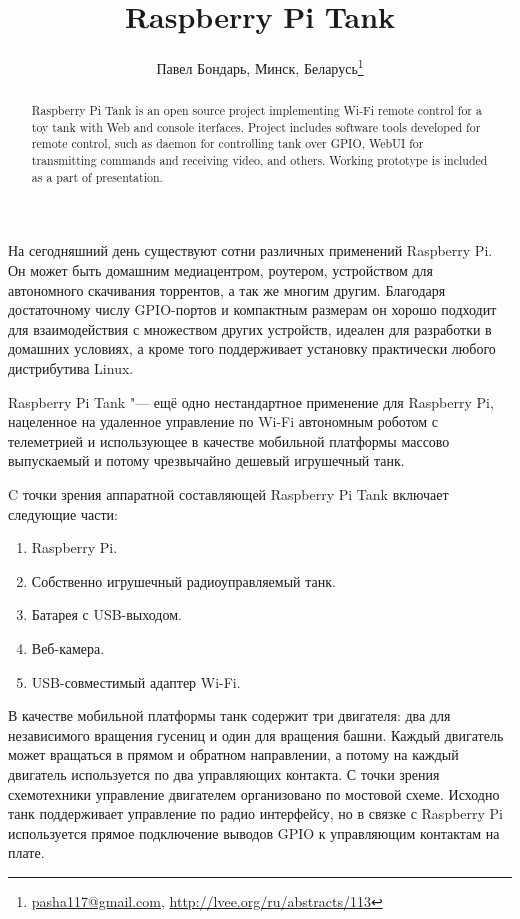 \documentclass[10pt, a5paper]{article}
\begin{document}
\title{Raspberry Pi Tank}
\author{Павел Бондарь, Минск, Беларусь\footnote{\url{pasha117@gmail.com}, \url{http://lvee.org/ru/abstracts/113}}}
\maketitle
\begin{abstract}
Raspberry Pi Tank is an open source project implementing Wi-Fi remote control for a toy tank with Web and console iterfaces. Project includes software tools developed for remote control, such as daemon for controlling tank over GPIO,  WebUI for transmitting commands and receiving video, and others. Working prototype is included as a part of presentation.
\end{abstract}
На сегодняшний день существуют сотни различных применений Raspberry Pi. Он может быть домашним медиацентром, роутером, устройством для автономного скачивания торрентов, а так же многим другим. Благодаря достаточному числу GPIO-портов и компактным размерам он хорошо подходит для взаимодействия с множеством других устройств, идеален для разработки в домашних условиях, а кроме того поддерживает установку практически любого дистрибутива Linux.

Raspberry Pi Tank "--- ещё одно нестандартное применение для Raspberry Pi, нацеленное на удаленное управление по Wi-Fi автономным роботом с телеметрией и использующее в качестве мобильной платформы массово выпускаемый и потому чрезвычайно дешевый игрушечный танк.

C точки зрения аппаратной составляющей Raspberry Pi Tank включает следующие части:

\begin{enumerate}
  \item Raspberry Pi.
  \item Собственно игрушечный радиоуправляемый танк.
  \item Батарея с USB-выходом.
  \item Веб-камера.
  \item USB-совместимый адаптер Wi-Fi.
\end{enumerate}

В качестве мобильной платформы танк содержит три двигателя: два для независимого вращения гусениц и один для вращения башни. Каждый двигатель может вращаться в прямом и обратном направлении, а потому на каждый двигатель используется по два управляющих контакта. С точки зрения схемотехники управление двигателем организовано по мостовой схеме.
Исходно танк поддерживает управление по радио интерфейсу, но в связке с Raspberry Pi используется прямое подключение выводов GPIO к управляющим контактам на плате.
\end{document}
